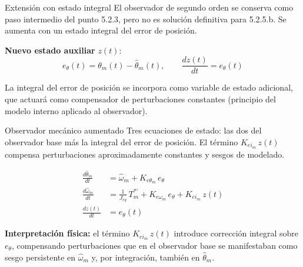 \documentclass[aspectratio=169,t]{beamer}
\begin{document}
\begin{frame}{Extensión con estado integral}
{\small\color{uncGray}El observador de segundo orden se conserva como paso intermedio del punto 5.2.3, pero no es solución definitiva para 5.2.5.b. Se aumenta con un estado integral del error de posición.}\par
\vspace{10mm}

\textbf{Nuevo estado auxiliar} $z(t)$:
\begin{equation*}
e_\theta(t) = \theta_m(t) - \hat{\theta}_m(t),
\qquad
\frac{dz(t)}{dt} = e_\theta(t)
\end{equation*}

\vspace{8mm}
{\small La integral del error de posición se incorpora como variable de estado adicional, que actuará como compensador de perturbaciones constantes (principio del modelo interno aplicado al observador).}
\end{frame}

\begin{frame}{Observador mecánico aumentado}
{\small\color{uncGray}Tres ecuaciones de estado: las dos del observador base más la integral del error de posición. El término $K_{ei_m}\,z(t)$ compensa perturbaciones aproximadamente constantes y sesgos de modelado.}\par
\vspace{6mm}

\begin{align*}
\frac{d\hat{\theta}_m}{dt} &= \hat{\omega}_m + K_{e\theta_m}\,e_\theta \\[3pt]
\frac{d\hat{\omega}_m}{dt} &= \tfrac{1}{J_{eq}}\,T_m^{*\prime} + K_{e\omega_m}\,e_\theta + K_{ei_m}\,z(t) \\[3pt]
\frac{dz(t)}{dt} &= e_\theta(t)
\end{align*}

\vspace{4mm}
{\small \textbf{Interpretación física:} el término $K_{ei_m}\,z(t)$ introduce corrección integral sobre $e_\theta$, compensando perturbaciones que en el observador base se manifestaban como sesgo persistente en $\hat\omega_m$ y, por integración, también en $\hat\theta_m$.}
\end{frame}
\end{document}
